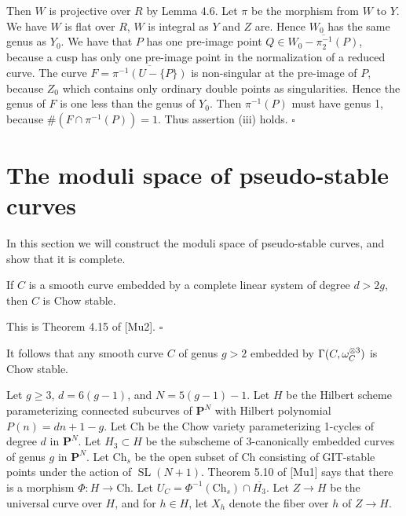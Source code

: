 \documentclass[12pt]{memoir}
\providecommand{\SL}{\operatorname{SL}}
\begin{document}
\begin{ptcbp}
Then $W$ is projective over $R$ by Lemma 4.6. Let $\pi$ be the morphism from $W$ to $Y$. We have $W$ is flat over $R$, $W$ is integral as $Y$ and $Z$ are. Hence $W_0$ has the same genus as $Y_0$. We have that $P$ has one pre-image point $Q \in \overline{W_0 - \pi_2^{-1}(P)}$, because a cusp has only one pre-image point in the normalization of a reduced curve. The curve $F = \overline{\pi^{-1}(U - \{P\})}$ is non-singular at the pre-image of $P$, because $Z_0$ which contains only ordinary double points as singularities. Hence the genus of $F$ is one less than the genus of $Y_0$. Then $\pi^{-1}(P)$ must have genus 1, because $\#(F \cap \pi^{-1}(P)) = 1$. Thus assertion (iii) holds. \hfill$\square$
\end{ptcbp}


\section{The moduli space of pseudo-stable curves}

In this section we will construct the moduli space of pseudo-stable curves, and show that it is complete.

\begin{Th}\label{thm:5.1}
If $C$ is a smooth curve embedded by a complete linear system of degree $d > 2g$, then $C$ is Chow stable.
\end{Th}

\begin{ptcbp}
This is Theorem 4.15 of [Mu2]. \hfill$\square$
\end{ptcbp}

It follows that any smooth curve $C$ of genus $g > 2$ embedded by $\Gamma(C, \omega_C^{\otimes 3})$ is Chow stable.

Let $g \geqslant 3$, $d = 6(g-1)$, and $N = 5(g-1) - 1$. Let $H$ be the Hilbert scheme parameterizing connected subcurves of $\mathbf{P}^N$ with Hilbert polynomial $P(n) = dn + 1 - g$. Let $\mathrm{Ch}$ be the Chow variety parameterizing 1-cycles of degree $d$ in $\mathbf{P}^N$. Let $H_3 \subset H$ be the subscheme of 3-canonically embedded curves of genus $g$ in $\mathbf{P}^N$. Let $\mathrm{Ch}_s$ be the open subset of $\mathrm{Ch}$ consisting of GIT-stable points under the action of $\SL(N+1)$. Theorem 5.10 of [Mu1] says that there is a morphism $\Phi\colon H \to \mathrm{Ch}$. Let $U_C = \Phi^{-1}(\mathrm{Ch}_s) \cap \overline{H_3}$. Let $Z \to H$ be the universal curve over $H$, and for $h \in H$, let $X_h$ denote the fiber over $h$ of $Z \to H$.
\end{document}
